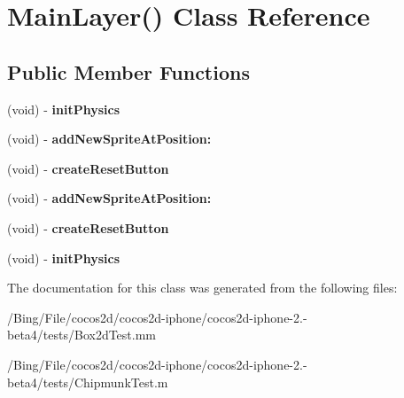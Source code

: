 \hypertarget{interface_main_layer_07_08}{\section{Main\-Layer() Class Reference}
\label{interface_main_layer_07_08}
}
\subsection*{Public Member Functions}
\begin{DoxyCompactItemize}
\item 
\hypertarget{interface_main_layer_07_08_ae262ee3a5a41aeb31c0008def8032005}{(void) -\/ {\bfseries init\-Physics}}\label{interface_main_layer_07_08_ae262ee3a5a41aeb31c0008def8032005}

\item 
\hypertarget{interface_main_layer_07_08_ab07962570fc30a2cbf8f1145755b1d4b}{(void) -\/ {\bfseries add\-New\-Sprite\-At\-Position\-:}}\label{interface_main_layer_07_08_ab07962570fc30a2cbf8f1145755b1d4b}

\item 
\hypertarget{interface_main_layer_07_08_add45405666c921e97dc936161ffed656}{(void) -\/ {\bfseries create\-Reset\-Button}}\label{interface_main_layer_07_08_add45405666c921e97dc936161ffed656}

\item 
\hypertarget{interface_main_layer_07_08_ae41fe2c30c7b11830b1f1b531030355e}{(void) -\/ {\bfseries add\-New\-Sprite\-At\-Position\-:}}\label{interface_main_layer_07_08_ae41fe2c30c7b11830b1f1b531030355e}

\item 
\hypertarget{interface_main_layer_07_08_add45405666c921e97dc936161ffed656}{(void) -\/ {\bfseries create\-Reset\-Button}}\label{interface_main_layer_07_08_add45405666c921e97dc936161ffed656}

\item 
\hypertarget{interface_main_layer_07_08_ae262ee3a5a41aeb31c0008def8032005}{(void) -\/ {\bfseries init\-Physics}}\label{interface_main_layer_07_08_ae262ee3a5a41aeb31c0008def8032005}

\end{DoxyCompactItemize}


The documentation for this class was generated from the following files\-:\begin{DoxyCompactItemize}
\item 
/\-Bing/\-File/cocos2d/cocos2d-\/iphone/cocos2d-\/iphone-\/2.-\/beta4/tests/Box2d\-Test.\-mm\item 
/\-Bing/\-File/cocos2d/cocos2d-\/iphone/cocos2d-\/iphone-\/2.-\/beta4/tests/Chipmunk\-Test.\-m\end{DoxyCompactItemize}
